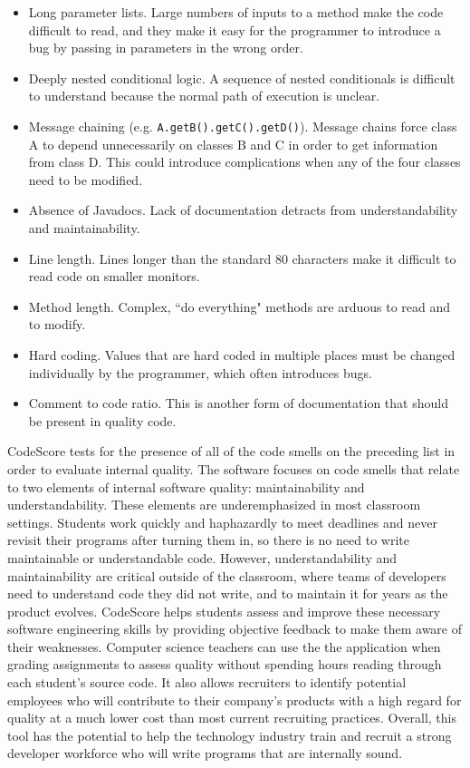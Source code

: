 \documentclass{sig-alternate}
\begin{document}
\begin{itemize}
	\item Long parameter lists. Large numbers of inputs to a method make the
		code difficult to read, and they make it easy for the programmer to
		introduce a bug by passing in parameters in the wrong order.
	\item Deeply nested conditional logic. A sequence of nested conditionals is
		difficult to understand because the normal path of execution is 
		unclear.
	\item Message chaining (e.g. \texttt{A.getB().getC().getD()}). Message
		chains force class A to depend unnecessarily on classes B and C in order
		to get information from class D. This could introduce complications when any of the
		four classes need to be modified.
	\item Absence of Javadocs. Lack of documentation detracts from
		understandability and maintainability.  
	\item Line length. Lines longer than the standard 80 characters make it
		difficult to read code on smaller monitors.
	\item Method length. Complex, ``do everything" methods are arduous to read and to
		modify. 
	\item Hard coding. Values that are hard coded in multiple places must be
		changed individually by the programmer, which often introduces bugs.
	\item Comment to code ratio. This is another form of documentation that
		should be present in quality code.
\end{itemize}

CodeScore tests for the presence of all of the code smells on the preceding list
in order to evaluate internal quality. The software focuses on code smells that
relate to two
elements of internal software quality: maintainability and understandability.
These elements are underemphasized in most classroom settings. Students work
quickly and haphazardly to meet deadlines and never revisit their programs after
turning them in, so there is no need to write maintainable or understandable code.
However, understandability and maintainability are critical outside of the
classroom, where teams of developers need to understand code they did not write,
and to maintain it for years as the product evolves. CodeScore helps
students assess and improve these necessary software engineering skills by
providing objective feedback to make them aware of their weaknesses. Computer
science teachers can use the the application when grading assignments to assess
quality without spending hours reading through each student's source code. It
also allows recruiters to identify potential employees who will contribute
to their company's products with a high regard for quality at a much lower cost
than most current recruiting practices. Overall, this tool
has the potential to help the technology industry train and recruit a strong developer
workforce who will write programs that are internally sound.
\end{document}
